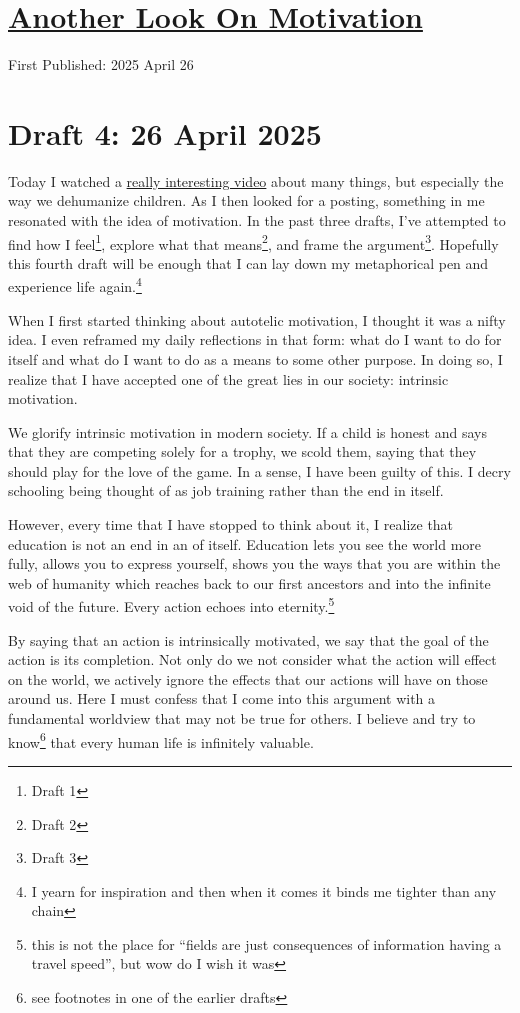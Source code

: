 \documentclass[12pt]{article}
\newcommand{\say}[1]{``#1''}
\renewcommand{\,}{\textsuperscript{,}}
\begin{document}
  
\doublespacing  
\section{\href{revisiting-motivation.html}{Another Look On Motivation}}  
First Published: 2025 April 26

\section{Draft 4: 26 April 2025}

Today I watched a \href{https://www.youtube.com/watch?v=iy53s5b3xkA}{really interesting video} about many things, but especially the way we dehumanize children.  
As I then looked for a posting, something in me resonated with the idea of motivation.  
In the past three drafts, I've attempted to find how I feel\footnote{Draft 1}, explore what that means\footnote{Draft 2}, and frame the argument\footnote{Draft 3}.  
Hopefully this fourth draft will be enough that I can lay down my metaphorical pen and experience life again.\footnote{I yearn for inspiration and then when it comes it binds me tighter than any chain}

When I first started thinking about autotelic motivation, I thought it was a nifty idea.  
I even reframed my daily reflections in that form: what do I want to do for itself and what do I want to do as a means to some other purpose.  
In doing so, I realize that I have accepted one of the great lies in our society: intrinsic motivation.  
  
We glorify intrinsic motivation in modern society.  
If a child is honest and says that they are competing solely for a trophy, we scold them, saying that they should play for the love of the game.  
In a sense, I have been guilty of this.  
I decry schooling being thought of as job training rather than the end in itself.

However, every time that I have stopped to think about it, I realize that education is not an end in an of itself.  
Education lets you see the world more fully, allows you to express yourself, shows you the ways that you are within the web of humanity which reaches back to our first ancestors and into the infinite void of the future.  
Every action echoes into eternity.\footnote{this is not the place for \say{fields are just consequences of information having a travel speed}, but wow do I wish it was}

By saying that an action is intrinsically motivated, we say that the goal of the action is its completion.  
Not only do we not consider what the action will effect on the world, we actively ignore the effects that our actions will have on those around us.  
Here I must confess that I come into this argument with a fundamental worldview that may not be true for others.  
I believe and try to know\footnote{see footnotes in one of the earlier drafts} that every human life is infinitely valuable.
\end{document}
